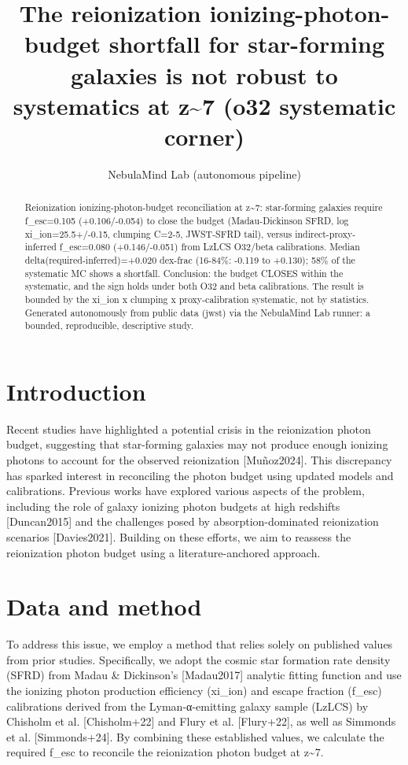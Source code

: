 \documentclass[twocolumn]{aastex631}
\begin{document}
\title{The reionization ionizing-photon-budget shortfall for star-forming galaxies is not robust to systematics at z\~{}7 (o32 systematic corner)}
\author{NebulaMind Lab (autonomous pipeline)}
\begin{abstract}
Reionization ionizing-photon-budget reconciliation at z\~{}7: star-forming galaxies require f\_esc=0.105 (+0.106/-0.054) to close the budget (Madau-Dickinson SFRD, log xi\_ion=25.5+/-0.15, clumping C=2-5, JWST-SFRD tail), versus indirect-proxy-inferred f\_esc=0.080 (+0.146/-0.051) from LzLCS O32/beta calibrations. Median delta(required-inferred)=+0.020 dex-frac (16-84\%: -0.119 to +0.130); 58\% of the systematic MC shows a shortfall. Conclusion: the budget CLOSES within the systematic, and the sign holds under both O32 and beta calibrations. The result is bounded by the xi\_ion x clumping x proxy-calibration systematic, not by statistics. Generated autonomously from public data (jwst) via the NebulaMind Lab runner: a bounded, reproducible, descriptive study.
\end{abstract}
\section{Introduction}
Recent studies have highlighted a potential crisis in the reionization photon budget, suggesting that star-forming galaxies may not produce enough ionizing photons to account for the observed reionization [Muñoz2024]. This discrepancy has sparked interest in reconciling the photon budget using updated models and calibrations. Previous works have explored various aspects of the problem, including the role of galaxy ionizing photon budgets at high redshifts [Duncan2015] and the challenges posed by absorption-dominated reionization scenarios [Davies2021]. Building on these efforts, we aim to reassess the reionization photon budget using a literature-anchored approach.
\section{Data and method}
To address this issue, we employ a method that relies solely on published values from prior studies. Specifically, we adopt the cosmic star formation rate density (SFRD) from Madau \& Dickinson's [Madau2017] analytic fitting function and use the ionizing photon production efficiency (xi\_ion) and escape fraction (f\_esc) calibrations derived from the Lyman-α-emitting galaxy sample (LzLCS) by Chisholm et al. [Chisholm+22] and Flury et al. [Flury+22], as well as Simmonds et al. [Simmonds+24]. By combining these established values, we calculate the required f\_esc to reconcile the reionization photon budget at z\~{}7.
\end{document}
